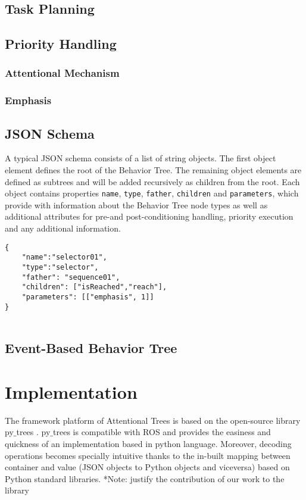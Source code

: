 \documentclass[conference]{IEEEtran}
\begin{document}
\subsection{Task Planning}
\subsection{Priority Handling}
\subsubsection{Attentional Mechanism}
\subsubsection{Emphasis}
\subsection{JSON Schema}
 A typical JSON schema consists of a list of string objects. The first object element defines the root of the Behavior Tree. The remaining object elements are defined as subtrees and will be added recursively as children from the root. Each object contains properties \verb|name|, \verb|type|, \verb|father|, \verb|children| and \verb|parameters|, which provide with information about the Behavior Tree node types as well as additional attributes for pre-and post-conditioning handling, priority execution and any additional information. 
 
 \begin{verbatim}
{
    "name":"selector01",
    "type":"selector",
    "father": "sequence01",
    "children": ["isReached","reach"],
    "parameters": [["emphasis", 1]]
}


\end{verbatim}

\subsection{Event-Based Behavior Tree}

\section{Implementation}
The framework platform of Attentional Trees is based on the open-source library py$\_$trees \cite{b4}. py$\_$trees is compatible with ROS and provides the easiness and quickness of an implementation based in python language. Moreover, decoding operations becomes specially intuitive thanks to the in-built mapping between container and value (JSON objects to Python objects and viceversa) based on Python standard libraries.
*Note: justify the contribution of our work to the library 
\end{document}

